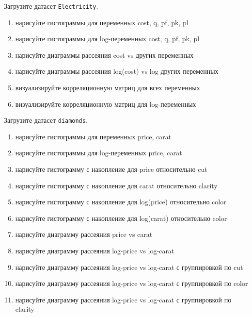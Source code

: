 \begin{exercise}
Загрузите датасет \texttt{Electricity}.
\begin{enumerate}
	\item нарисуйте гистограммы для переменных cost, q, pf, pk, pl
	\item нарисуйте гистограммы для log-переменных cost, q, pf, pk, pl
	\item нарисуйте диаграммы рассеяния cost vs других переменных
	\item нарисуйте диаграммы рассеяния log(cost) vs log других переменных
	\item визуализируйте корреляционную матриц для всех переменных
	\item визуализируйте корреляционную матриц для log-переменных
\end{enumerate}
\end{exercise}

\begin{exercise}
Загрузите датасет \texttt{diamonds}.
\begin{enumerate}
	\item нарисуйте гистограммы для переменных price, carat
	\item нарисуйте гистограммы для log-переменных price, carat
	\item нарисуйте гистограмму с накопление для price относительно cut
	\item нарисуйте гистограмму с накопление для carat относительно clarity 
	\item нарисуйте гистограмму с накопление для log(price) относительно color
	\item нарисуйте гистограмму с накопление для log(carat) относительно color
	\item нарисуйте диаграмму рассеяния price vs carat
	\item нарисуйте диаграмму рассеяния log-price vs log-carat
	\item нарисуйте диаграмму рассеяния log-price vs log-carat с группировкой по cut
	\item нарисуйте диаграмму рассеяния log-price vs log-carat с группировкой по color
	\item нарисуйте диаграмму рассеяния log-price vs log-carat с группировкой по clarity
\end{enumerate}
\end{exercise}

